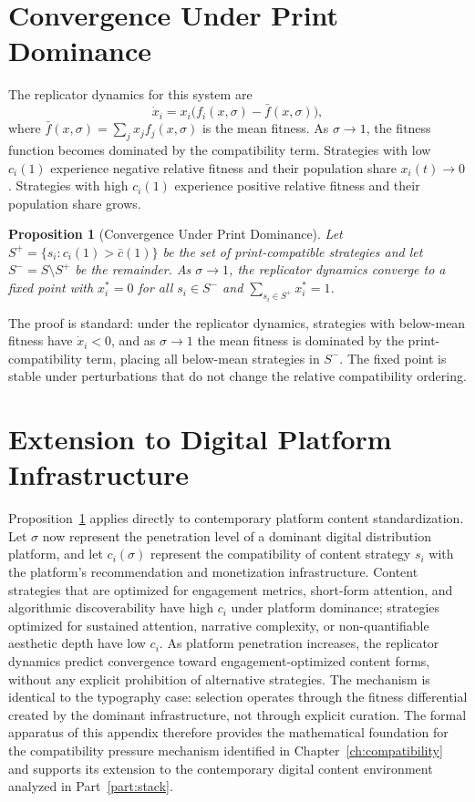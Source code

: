 \documentclass[12pt, oneside]{book}
\theoremstyle{plain}
\newtheorem{proposition}[theorem]{Proposition}
\theoremstyle{definition}
\theoremstyle{remark}
\theoremstyle{definition}
\begin{document}
\section{Convergence Under Print Dominance}

The replicator dynamics for this system are
\[
\dot{x}_i = x_i\bigl(f_i(x, \sigma) - \bar{f}(x, \sigma)\bigr),
\]
where $\bar{f}(x, \sigma) = \sum_j x_j f_j(x, \sigma)$ is the mean fitness.
As $\sigma \to 1$, the fitness function becomes dominated by the compatibility
term. Strategies with low $c_i(1)$ experience negative relative fitness and
their population share $x_i(t) \to 0$. Strategies with high $c_i(1)$ experience
positive relative fitness and their population share grows.

\begin{proposition}[Convergence Under Print Dominance]
\label{prop:compatibility}
Let $S^+ = \{s_i : c_i(1) > \bar{c}(1)\}$ be the set of print-compatible strategies
and let $S^- = S \setminus S^+$ be the remainder. As $\sigma \to 1$, the replicator
dynamics converge to a fixed point with $x_i^* = 0$ for all $s_i \in S^-$ and
$\sum_{s_i \in S^+} x_i^* = 1$.
\end{proposition}

The proof is standard: under the replicator dynamics, strategies with below-mean
fitness have $\dot{x}_i < 0$, and as $\sigma \to 1$ the mean fitness is dominated
by the print-compatibility term, placing all below-mean strategies in $S^-$.
The fixed point is stable under perturbations that do not change the relative
compatibility ordering.

\section{Extension to Digital Platform Infrastructure}

Proposition~\ref{prop:compatibility} applies directly to contemporary platform
content standardization. Let $\sigma$ now represent the penetration level of a
dominant digital distribution platform, and let $c_i(\sigma)$ represent the
compatibility of content strategy $s_i$ with the platform's recommendation and
monetization infrastructure. Content strategies that are optimized for engagement
metrics, short-form attention, and algorithmic discoverability have high $c_i$
under platform dominance; strategies optimized for sustained attention, narrative
complexity, or non-quantifiable aesthetic depth have low $c_i$. As platform
penetration increases, the replicator dynamics predict convergence toward
engagement-optimized content forms, without any explicit prohibition of alternative
strategies. The mechanism is identical to the typography case: selection operates
through the fitness differential created by the dominant infrastructure, not through
explicit curation. The formal apparatus of this appendix therefore provides the
mathematical foundation for the compatibility pressure mechanism identified in
Chapter~\ref{ch:compatibility} and supports its extension to the contemporary
digital content environment analyzed in Part~\ref{part:stack}.
\end{document}
